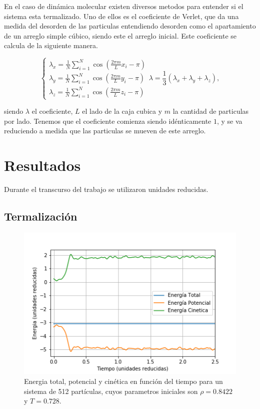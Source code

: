 \documentclass[%
 reprint,
 amsmath,amssymb,
 aps,
]{revtex4-1}
\begin{document}
En el caso de din\'amica molecular existen diversos metodos para entender si
el sistema esta termalizado. Uno de ellos es el coeficiente de Verlet, que da
una medida del desorden de las particulas entendiendo desorden como el
apartamiento de un arreglo simple c\'ubico, siendo este el arreglo inicial.
Este coeficiente se calcula de la siguiente manera.

\begin{equation}
  \left \{
    \begin{matrix}
      \lambda_x = \frac{1}{N} \sum_{i = 1}^N \cos \left( \frac{2 \pi m}{L} x_i - \pi \right) \\
      \lambda_y = \frac{1}{N} \sum_{i = 1}^N \cos \left( \frac{2 \pi m}{L} y_i - \pi \right) \\
      \lambda_z = \frac{1}{N} \sum_{i = 1}^N \cos \left( \frac{2 \pi m}{L} z_i - \pi \right)
    \end{matrix}
    \lambda = \frac{1}{3} (\lambda_x + \lambda_y + \lambda_z) ,
  \right .
\end{equation}

siendo $\lambda$ el coeficiente, $L$ el lado de la caja cubica y $m$ la
cantidad de particulas por lado. Tenemos que el coeficiente comienza siendo
id\'enticamente $1$, y se va reduciendo a medida que las particulas se mueven
de este arreglo.


\section{Resultados}

Durante el transcurso del trabajo se utilizaron unidades reducidas.

\subsection{Termalizaci\'on}

\begin{figure}
  \begin{center}
  \includegraphics[scale=0.62]{images/e_vs_t.png}
  \caption{Energia total, potencial y cin\'etica en funci\'on del tiempo para
  un sistema de 512 part\'iculas, cuyos parametros iniciales son
  $\rho = 0.8422$ y $T = 0.728$.}
  \label{e_vs_t}
\end{center}
\end{figure}
\end{document}
